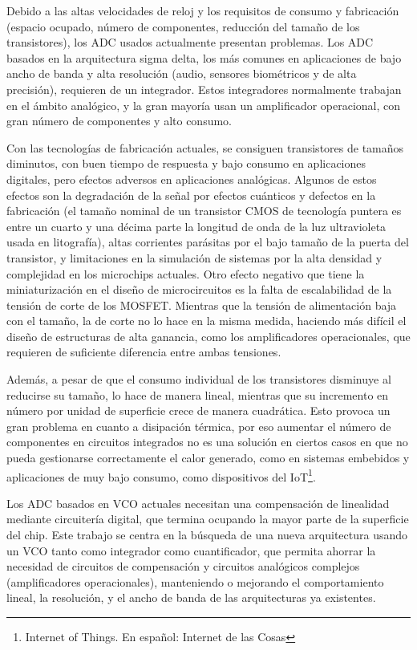 \documentclass[12pt]{report} %
\begin{document}
	Debido a las altas velocidades de reloj y los requisitos de consumo y fabricación (espacio ocupado, número de componentes, reducción del tamaño de los transistores), los ADC usados actualmente presentan problemas. Los ADC basados en la arquitectura sigma delta, los más comunes en aplicaciones de bajo ancho de banda y alta resolución (audio, sensores biométricos y de alta precisión), requieren de un integrador. Estos integradores normalmente trabajan en el ámbito analógico, y la gran mayoría usan un amplificador operacional, con gran número de componentes y alto consumo.
	
	Con las tecnologías de fabricación actuales, se consiguen transistores de tamaños diminutos, con buen tiempo de respuesta y bajo consumo en aplicaciones digitales, pero efectos adversos en aplicaciones analógicas.
	Algunos de estos efectos son la degradación de la señal por efectos cuánticos y defectos en la fabricación (el tamaño nominal de un transistor CMOS de tecnología puntera es entre un cuarto y una décima parte la longitud de onda de la luz ultravioleta usada en litografía), altas corrientes parásitas por el bajo tamaño de la puerta del transistor, y limitaciones en la simulación de sistemas por la alta densidad y complejidad en los microchips actuales. Otro efecto negativo que tiene la miniaturización en el diseño de microcircuitos es la falta de escalabilidad de la tensión de corte de los MOSFET. Mientras que la tensión de alimentación baja con el tamaño, la de corte no lo hace en la misma medida, haciendo más difícil el diseño de estructuras de alta ganancia, como los amplificadores operacionales, que requieren de suficiente diferencia entre ambas tensiones.
	
	Además, a pesar de que el consumo individual de los transistores disminuye al reducirse su tamaño, lo hace de manera lineal, mientras que su incremento en número por unidad de superficie crece de manera cuadrática. Esto provoca un gran problema en cuanto a disipación térmica, por eso aumentar el número de componentes en circuitos integrados no es una solución en ciertos casos en que no pueda gestionarse correctamente el calor generado, como en sistemas embebidos y aplicaciones de muy bajo consumo, como dispositivos del IoT\footnote{Internet of Things. En español: Internet de las Cosas}.
	
	Los ADC basados en VCO actuales necesitan una compensación de linealidad mediante circuitería digital, que termina ocupando la mayor parte de la superficie del chip. Este trabajo se centra en la búsqueda de una nueva arquitectura usando un VCO tanto como integrador como cuantificador, que permita ahorrar la necesidad de circuitos de compensación y circuitos analógicos complejos (amplificadores operacionales), manteniendo o mejorando el comportamiento lineal, la resolución, y el ancho de banda de las arquitecturas ya existentes.
	
\end{document}
